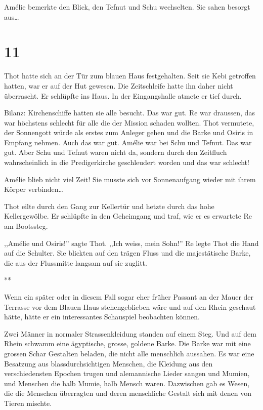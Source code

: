 \documentclass[11pt,titlepage,a5paper]{book}
\newcommand{\sterne}{\par{\centering ***\par}}
\begin{document}
Amélie bemerkte den Blick, den Tefnut und Schu wechselten. Sie sahen besorgt aus\dots

\section*{11}

Thot hatte sich an der Tür zum blauen Haus festgehalten. Seit sie Kebi getroffen hatten, war er auf der Hut gewesen. Die Zeitschleife hatte ihn daher nicht überrascht. Er schlüpfte ins Haus. In der Eingangshalle atmete er tief durch.

Bilanz: Kirchenschiffe hatten sie alle besucht. Das war gut. Re war draussen, das war höchstens schlecht für alle die der Mission schaden wollten. Thot vermutete, der Sonnengott würde als erstes zum Anleger gehen und die Barke und Osiris in Empfang nehmen. Auch das war gut. Amélie war bei Schu und Tefnut. Das war gut. Aber Schu und Tefnut waren nicht da, sondern durch den Zeitfluch wahrscheinlich in die Predigerkirche geschleudert worden und das war schlecht!

Amélie blieb nicht viel Zeit! Sie musste sich vor Sonnenaufgang wieder mit ihrem Körper verbinden\dots 

Thot eilte durch den Gang zur Kellertür und hetzte durch das hohe Kellergewölbe. Er schlüpfte in den Geheimgang und traf, wie er es erwartete Re am Bootssteg.

,,Amélie und Osiris!'' sagte Thot. ,,Ich weiss, mein Sohn!'' Re legte Thot die Hand auf die Schulter. Sie blickten auf den trägen Fluss und die majestätische Barke, die aus der Flussmitte langsam auf sie zuglitt. 

\sterne

Wenn ein später oder in diesem Fall sogar eher früher Passant an der Mauer der Terrasse vor dem Blauen Haus stehengeblieben wäre und auf den Rhein geschaut hätte, hätte er ein interessantes Schauspiel beobachten können.

Zwei Männer in normaler Strassenkleidung standen auf einem Steg. Und auf dem Rhein schwamm eine ägyptische, grosse, goldene Barke. Die Barke war mit eine grossen Schar Gestalten beladen, die nicht alle menschlich aussahen. Es war eine Besatzung aus blassdurchsichtigen Menschen, die Kleidung aus den verschiedensten Epochen trugen und alemannische Lieder sangen und Mumien, und Menschen die halb Mumie, halb Mensch waren. Dazwischen gab es Wesen, die die Menschen überragten und deren menschliche Gestalt sich mit denen von Tieren mischte. 
\end{document}
